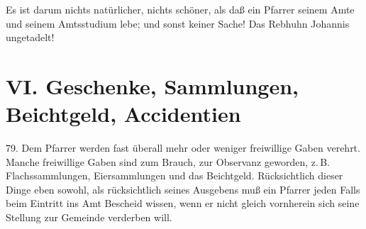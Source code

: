 Es ist darum nichts natürlicher, nichts schöner, als daß ein Pfarrer seinem Amte und seinem Amtsstudium lebe; und sonst keiner Sache! Das Rebhuhn Johannis ungetadelt!

\section[VI. Geschenke, Sammlungen, Beichtgeld]{VI. Geschenke, Sammlungen, Beichtgeld, Accidentien}

79. Dem Pfarrer werden fast überall mehr oder weniger freiwillige Gaben verehrt. Manche freiwillige Gaben sind zum Brauch, zur Observanz geworden, z.\,B. Flachssammlungen, Eiersammlungen und das Beichtgeld. Rücksichtlich dieser Dinge eben sowohl, als rücksichtlich seines
Ausgebens muß ein Pfarrer jeden Falls beim Eintritt ins Amt Bescheid wissen, wenn er nicht gleich vornherein sich seine Stellung zur Gemeinde verderben will.

